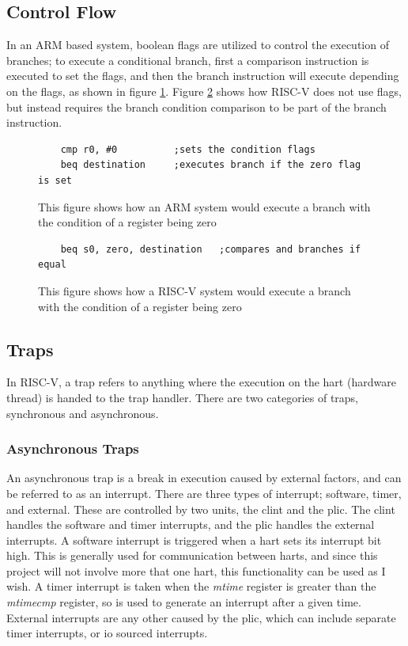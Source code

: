 \subsection{Control Flow}
In an ARM based system, boolean flags are utilized to control the execution of branches; to execute a conditional branch, first a comparison instruction is executed to set the flags, and then the branch instruction will execute depending on the flags, as shown in figure \ref{fig:arm_branch}. Figure \ref{fig:riscv_branch} shows how RISC-V does not use flags, but instead requires the branch condition comparison to be part of the branch instruction.
\begin{figure}[H]
\begin{verbatim}
    cmp r0, #0          ;sets the condition flags
    beq destination     ;executes branch if the zero flag is set
\end{verbatim}
\caption[ARM branching code]{This figure shows how an ARM system would execute a branch with the condition of a register being zero}
\label{fig:arm_branch}
\end{figure}
\begin{figure}[H]
\begin{verbatim}
    beq s0, zero, destination   ;compares and branches if equal
\end{verbatim}
\caption[RISC-V branching code]{This figure shows how a RISC-V system would execute a branch with the condition of a register being zero}
\label{fig:riscv_branch}
\end{figure}
\subsection{Traps}
In RISC-V, a trap refers to anything where the execution on the hart (hardware thread) is handed to the trap handler. There are two categories of traps, synchronous and asynchronous.
\subsubsection{Asynchronous Traps}
An asynchronous trap is a break in execution caused by external factors, and can be referred to as an interrupt. There are three types of interrupt; software, timer, and external. These are controlled by two units, the \ac{clint} and the \ac{plic}. The \ac{clint} handles the software and timer interrupts, and the \ac{plic} handles the external interrupts. A software interrupt is triggered when a hart sets its interrupt bit high. This is generally used for communication between harts, and since this project will not involve more that one hart, this functionality can be used as I wish. A timer interrupt is taken when the \textit{mtime} register is greater than the \textit{mtimecmp} register, so is used to generate an interrupt after a given time. External interrupts are any other caused by the \ac{plic}, which can include separate timer interrupts, or \ac{io} sourced interrupts\cite{sifive_manual}.
